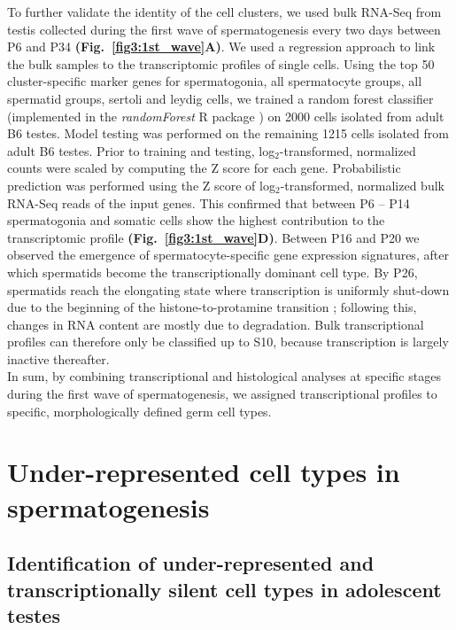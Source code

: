 To further validate the identity of the cell clusters, we used bulk RNA-Seq from testis collected during the first wave of spermatogenesis every two days between P6 and P34 \textbf{(Fig.~\ref{fig3:1st_wave}A)}. We used a regression approach to link the bulk samples to the transcriptomic profiles of single cells. Using the top 50 cluster-specific marker genes for spermatogonia, all spermatocyte groups, all spermatid groups, sertoli and leydig cells, we trained a random forest classifier (implemented in the \emph{randomForest} R package \citep{Liaw2002}) on 2000 cells isolated from adult B6 testes. Model testing was performed on the remaining 1215 cells isolated from adult B6 testes. Prior to training and testing, log$_2$-transformed, normalized counts were scaled by computing the Z score for each gene. Probabilistic prediction was performed using the Z score of log$_2$-transformed, normalized bulk RNA-Seq reads of the input genes. This confirmed that between P6 – P14 spermatogonia and somatic cells show the highest contribution to the transcriptomic profile \textbf{(Fig.~\ref{fig3:1st_wave}D)}. Between P16 and P20 we observed the emergence of spermatocyte-specific gene expression signatures, after which spermatids become the transcriptionally dominant cell type. By P26, spermatids reach the elongating state where transcription is uniformly shut-down due to the beginning of the histone-to-protamine transition \citep{Steger1999}; following this, changes in RNA content are mostly due to degradation. Bulk transcriptional profiles can therefore only be classified up to S10, because transcription is largely inactive thereafter.\\

In sum, by combining transcriptional and histological analyses at specific stages during the first wave of spermatogenesis, we assigned transcriptional profiles to specific, morphologically defined germ cell types.

\section{Under-represented cell types in spermatogenesis}
\subsection*{Identification of under-represented and transcriptionally silent cell types in adolescent testes}

